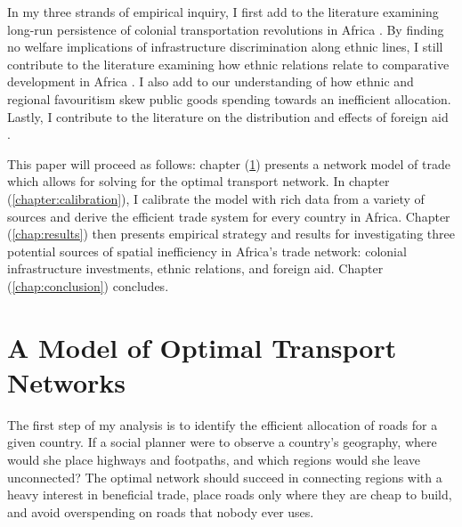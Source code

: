 \documentclass[11pt, oneside]{article}   	%
\let\oldref\ref
\renewcommand{\ref}[1]{(\oldref{#1})}
\begin{document}
In my three strands of empirical inquiry, I first add to the literature examining long-run persistence of colonial transportation revolutions in Africa \citep{Jedwab_PermanentEffectsTransportation_2016a,Jedwab_HistoryPathDependence_2017a}. By finding no welfare implications of infrastructure discrimination along ethnic lines, I still contribute to the literature examining how ethnic relations relate to comparative development in Africa \citep{Michalopoulos_PreColonialEthnicInstitutions_2013,Michalopoulos_NationalInstitutionsSubnational_2014,Michalopoulos_LongRunEffectsScramble_2016}. I also add to our understanding of how ethnic \citep{DeLuca_Ethnicfavoritismaxiom_2018} and regional favouritism \citep{Hodler_RegionalFavoritism_2014,Burgess_ValueDemocracyEvidence_2015} skew public goods spending towards an inefficient allocation. Lastly, I contribute to the literature on the distribution and effects of foreign aid \citep{Clemens_CountingChickenswhen_2012,Nunn_USFoodAid_2014,Dreher_Aidgrowthregional_2015,Dreher_AidChinaGrowth_2017}.

This paper will proceed as follows: chapter \ref{chap:model} presents a network model of trade which allows for solving for the optimal transport network. In chapter \ref{chapter:calibration}, I calibrate the model with rich data from a variety of sources and derive the efficient trade system for every country in Africa. Chapter \ref{chap:results} then presents empirical strategy and results for investigating three potential sources of spatial inefficiency in Africa's trade network: colonial infrastructure investments, ethnic relations, and foreign aid. Chapter \ref{chap:conclusion} concludes.

\section{A Model of Optimal Transport Networks}
\label{chap:model}
The first step of my analysis is to identify the efficient allocation of roads for a given country. If a social planner were to observe a country's geography, where would she place highways and footpaths, and which regions would she leave unconnected? The optimal network should succeed in connecting regions with a heavy interest in beneficial trade, place roads only where they are cheap to build, and avoid overspending on roads that nobody ever uses.
\end{document}
